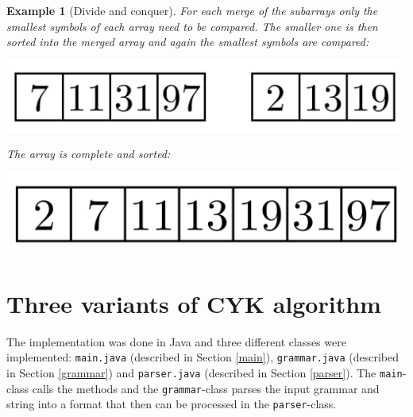 \documentclass[a4paper, 11pt]{article}
\newtheorem*{example*}{Example}
\begin{document}
\begin{example*}[Divide and conquer]
\newpage
For each merge of the subarrays only the smallest symbols of each array need to be compared. The smaller one is then sorted into the merged array and again the smallest symbols are compared:
\begin{center}
\includegraphics[scale=0.125]{images/merge6.png}
\end{center}

The array is complete and sorted:
\begin{center}
\includegraphics[scale=0.125]{images/merge7.png}
\end{center}


\end{example*}






\pagebreak













\section{Three variants of CYK algorithm}
\label{systemdesign}

The implementation was done in Java and three different classes were implemented: \texttt{main.java} (described in Section \ref{main}), \texttt{grammar.java} (described in Section \ref{grammar}) and \texttt{parser.java} (described in Section \ref{parser}). The \texttt{main}-class calls the methods and the \texttt{grammar}-class parses the input grammar and string into a format that then can be processed in the \texttt{parser}-class.
\end{document}

